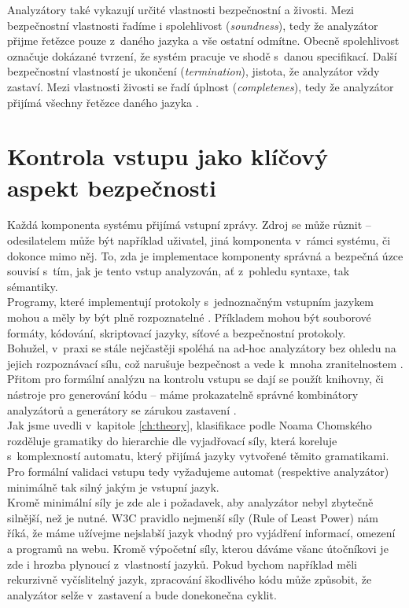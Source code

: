 Analyzátory také vykazují určité vlastnosti bezpečnostní a živosti. Mezi bezpečnostní vlastnosti řadíme i spolehlivost (\textit{soundness}), 
tedy že analyzátor přijme řetězce pouze z~daného jazyka a vše ostatní odmítne. Obecně spolehlivost označuje dokázané tvrzení, že systém pracuje 
ve shodě s~danou specifikací. Další bezpečnostní vlastností je ukončení (\textit{termination}), jistota, že analyzátor vždy zastaví. 
Mezi vlastnosti živosti se řadí úplnost (\textit{completenes}), tedy že analyzátor přijímá všechny řetězce daného jazyka \cite[str. 490]{Sass2013}.

\section{Kontrola vstupu jako klíčový aspekt bezpečnosti} \label{sec:4:inputcontrol}
Každá komponenta systému přijímá vstupní zprávy. Zdroj se může různit – odesilatelem může být například uživatel, jiná komponenta v~rámci systému, 
či dokonce mimo něj. To, zda je implementace komponenty správná a bezpečná úzce souvisí s~tím, jak je tento vstup  analyzován, ať z~pohledu syntaxe, 
tak sémantiky. \\

Programy, které implementují protokoly s~jednoznačným vstupním jazykem mohou a měly by být plně rozpoznatelné 
\cite[str. 490]{Sass2013}. Příkladem mohou být  souborové formáty, kódování, skriptovací jazyky, síťové a bezpečnostní protokoly. \\

Bohužel, v~praxi se stále nejčastěji spoléhá na ad-hoc analyzátory bez ohledu na jejich rozpoznávací sílu, což narušuje bezpečnost a vede k~mnoha 
zranitelnostem \cite[str. 490]{Sass2013}. Přitom pro formální analýzu na kontrolu vstupu se dají se použít knihovny, či nástroje pro generování 
kódu -- máme prokazatelně správné kombinátory analyzátorů a generátory se zárukou zastavení \cite[str. 490]{Sass2013}. \\

Jak jsme uvedli v~kapitole \ref{ch:theory}, klasifikace podle Noama Chomského rozděluje gramatiky do hierarchie dle vyjadřovací síly, která koreluje 
s~komplexností automatu, který přijímá jazyky vytvořené těmito gramatikami. Pro formální validaci vstupu tedy vyžadujeme automat (respektive analyzátor) 
minimálně tak silný jakým je vstupní jazyk. \\

Kromě minimální síly je zde ale i požadavek, aby analyzátor nebyl zbytečně silnější, než je nutné.
W3C pravidlo nejmenší síly (Rule of Least Power) \cite{w3cpower} nám říká, že máme užívejme nejslabší jazyk vhodný pro vyjádření informací, 
omezení a programů na webu. Kromě výpočetní síly, kterou dáváme všanc útočníkovi je zde i hrozba plynoucí z~vlastností jazyků. Pokud bychom 
například měli rekurzivně vyčíslitelný jazyk, zpracování škodlivého kódu může způsobit, že analyzátor selže v~zastavení a bude donekonečna cyklit. \\ 

